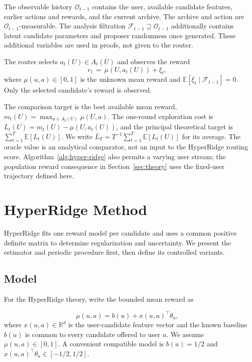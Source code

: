 \documentclass{article} %
\providecommand{\E}{\mathbb{E}}
\begin{document}
The observable history $\mathcal O_{t-1}$ contains the user, available
candidate features, earlier actions and rewards, and the current archive.
The archive and action are $\mathcal O_{t-1}$-measurable. The analysis
filtration $\mathcal F_{t-1}\supseteq\mathcal O_{t-1}$ additionally contains
latent candidate parameters and proposer randomness once generated.
These additional variables are used in proofs, not given to the router.

The router selects $a_t(U) \in A_t(U)$ and observes the reward
\begin{equation}
r_t \,=\, \mu(U, a_t(U)) + \xi_t ,
\end{equation}
where $\mu(u,a)\in[0,1]$ is the unknown mean reward and
$\E[\xi_t\mid\mathcal F_{t-1}]=0$. Only the selected candidate's reward is
observed.

The comparison target is the best available mean reward,
$m_t(U)=\max_{a\in A_t(U)}\mu(U,a)$. The one-round exploration cost is
$L_t(U)=m_t(U)-\mu(U,a_t(U))$, and the principal theoretical target is
$\sum_{t=1}^T\E[L_t(U)]$. We write
$\bar L_T=T^{-1}\sum_{t=1}^T\E[L_t(U)]$ for its average.
The oracle value is an analytical comparator, not an input to the
HyperRidge routing score. Algorithm~\ref{alg:hyper-ridge} also permits a
varying user stream; the population reward consequence in
Section~\ref{sec:theory} uses the fixed-user trajectory defined here.

\section{HyperRidge Method}
\label{sec:method}

HyperRidge fits one reward model per candidate and uses a common positive
definite matrix to determine regularization and uncertainty. We present the
estimator and periodic procedure first, then define its controlled variants.

\subsection{Model}
\label{sec:method-model}

For the HyperRidge theory, write the bounded mean reward as

\begin{equation}
\mu(u,a)=b(u)+x(u,a)^\top\theta_a ,
\end{equation}
where $x(u,a)\in\mathbb{R}^d$ is the user-candidate feature vector and the known baseline $b(u)$ is common to every candidate offered to user $u$. We assume $\mu(u,a)\in[0,1]$. A convenient compatible model is $b(u)=1/2$ and $x(u,a)^\top\theta_a\in[-1/2,1/2]$.
\end{document}
